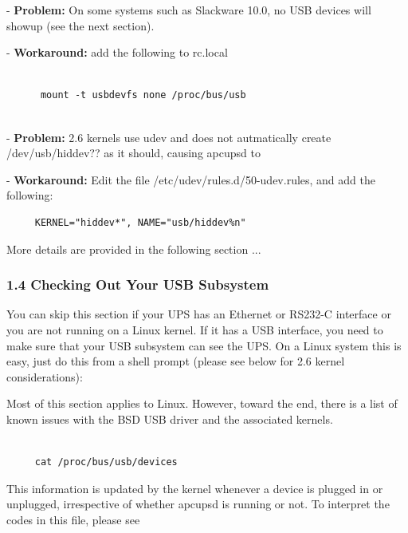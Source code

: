 - {\bf Problem:} On some systems such as Slackware 10.0, no USB devices will
showup (see the next section).  

- {\bf Workaround:} add the following to rc.local 

\footnotesize
\begin{verbatim}
     
      mount -t usbdevfs none /proc/bus/usb
     
\end{verbatim}
\normalsize

- {\bf Problem:} 2.6 kernels use udev and does not autmatically create
/dev/usb/hiddev?? as it should, causing apcupsd to  

- {\bf Workaround:} Edit the file /etc/udev/rules.d/50-udev.rules, and add the
following: 

\footnotesize
\begin{verbatim}
     KERNEL="hiddev*", NAME="usb/hiddev%n"
\end{verbatim}
\normalsize

More details are provided in the following section ... 

\label{Checking-Out-Your-USB-Subsystem}

\subsubsection*{1.4 Checking Out Your USB Subsystem}

You can skip this section if your UPS has an Ethernet or RS232-C interface or
you are not running on a Linux kernel.  If it has a USB interface, you need to
make sure that your USB subsystem can see the UPS. On a Linux system this is
easy, just do this from a shell prompt (please see below for 2.6 kernel
considerations):  

Most of this section applies to Linux. However, toward the end, there is a
list of known issues with the BSD USB driver and the associated kernels. 

\footnotesize
\begin{verbatim}
     
     cat /proc/bus/usb/devices
\end{verbatim}
\normalsize

This information is updated by the kernel whenever a device is plugged in or
unplugged, irrespective of whether apcupsd is running or not. To interpret the
codes in this file, please see 

